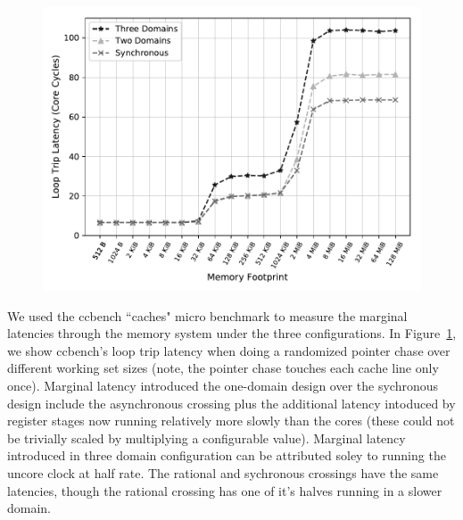 \begin{figure}[htb]
    \centering
    \includegraphics[width=\columnwidth]{figures/boom-ccbench.pdf}
    \caption{}
    \label{fig:boom-ccbench}
\end{figure}

We used the ccbench ``caches" micro benchmark to measure the marginal latencies
through the memory system under the three configurations. In
Figure~\ref{fig:boom-ccbench}, we show ccbench's loop trip latency when doing a
randomized pointer chase over different working set sizes (note, the pointer
chase touches each cache line only once). Marginal latency introduced the
one-domain design over the sychronous design include the asynchronous crossing
plus the additional latency intoduced by register stages now running relatively
more slowly than the cores (these could not be trivially scaled by multiplying
a configurable value). Marginal latency introduced in three domain
configuration can be attributed soley to running the uncore clock at half rate.
The rational and sychronous crossings have the same latencies, though the
rational crossing has one of it's halves running in a slower domain.

